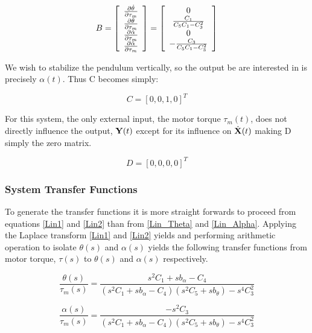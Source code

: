 \documentclass{article}
\theoremstyle{plain}
\theoremstyle{definition}
\theoremstyle{remark}
\begin{document}
$$ B = \left[ \begin{array}{c l} 
\frac{\partial \dot{\theta}}{\partial \tau_m} \\
\frac{\partial \ddot{\theta}}{\partial \tau_m} \\
\frac{\partial \dot{\alpha}}{\partial \tau_m} \\
\frac{\partial \ddot{\alpha}}{\partial \tau_m} \\
 \end{array} \right] 
= \left[  \begin{array}{c l} 
0 \\ \frac{C_1}{C_5 C_1 - C_3^2} \\ 0 \\ -\frac{C_3}{C_5 C_1 - C_3^2} \\
\end{array} \right] $$

We wish to stabilize the pendulum vertically, so the output be are interested in is precisely $\alpha(t)$.  Thus C becomes simply:

$$ C = [0, 0, 1, 0]^T $$

For this system, the only external input, the motor torque $\tau_{m}(t)$, does not directly influence the output, ${\bf{Y}}(t)$ except for its influence on  $\dot{\bf{X}}(t)$ making D simply the zero matrix.

$$ D = [0, 0, 0, 0]^T$$

\subsubsection*{System Transfer Functions}

To generate the transfer functions it is more straight forwards to proceed from equations \eqref{Lin1} and \eqref{Lin2} than from \eqref{Lin_Theta} and \eqref{Lin_Alpha}.  Applying the Laplace transform \eqref{Lin1} and \eqref{Lin2} yields and performing arithmetic operation to isolate $\theta (s)$ and $\alpha (s)$ yields the following transfer functions from motor torque, $ \tau (s)$ to $\theta (s)$ and $\alpha (s)$ respectively.


\begin{equation}
\frac{\theta(s)}{\tau_{m}(s)} = \frac{s^2 C_1 + s b_{\alpha} - C_4}{\left(s^2C_1 + s b_{\alpha} - C_4 \right) \left(s^2 C_5  + s b_{\theta} \right) - s^4 C_3^2}
\label{TF_Theta}
\end{equation}

\begin{equation}
\frac{\alpha(s)}{\tau_{m}(s)} = \frac{-s^2 C_3}{\left(s^2C_1 + s b_{\alpha} - C_4 \right) \left(s^2 C_5  + s b_{\theta} \right) - s^4 C_3^2}
\label{TF_Alpha}
\end{equation}
\end{document}
